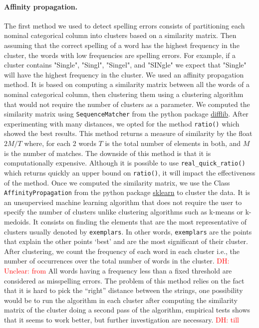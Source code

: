 \documentclass{article}
\newcommand\dhawat[1]{\textcolor{red}{DH: #1}}
\begin{document}
\paragraph{ Affinity propagation.}
\label{sub:Affinity propagation algorithm}
The first method we used to detect spelling errors consists of partitioning each nominal categorical column into clusters based on a similarity matrix.
Then assuming that the correct spelling of a word has the highest frequency in the cluster, the words with low frequencies are spelling errors.
For example, if a cluster contains "Single", "Singl", "Singel", and "SINgle" we expect that "Single" will have the highest frequency in the cluster.
We used an affinity propagation method.
It is based on computing a similarity matrix between all the words of a nominal categorical column, then clustering them using a clustering algorithm that would not require the number of clusters as a parameter.
We computed the similarity matrix using \texttt{SequenceMatcher} from the python package \href{https://docs.python.org/3/library/difflib.html}{difflib}.
After experimenting with many distances, we opted for the method \texttt{ratio()} which showed the best results.
This method returns a measure of similarity by the float $2M /T$ where, for each 2 words $T$ is the total number of elements in both, and $M$ is the number of matches.
The downside of this method is that it is computationally expensive.
Although it is possible to use \texttt{real\_quick\_ratio()} which returns quickly an upper bound on \texttt{ratio()}, it will impact the effectiveness of the method. Once we computed the similarity matrix, we use the Class \texttt{AffinityPropagation} from the python package \href{https://scikit-learn.org/stable/modules/generated/sklearn.cluster.AffinityPropagation.html#sklearn-cluster-affinitypropagation}{sklearn} to cluster the data.
It is an unsupervised machine learning algorithm that does not require the user to specify the number of clusters unlike clustering algorithms such as k-means or k-medoids.
It consists on finding the elements that are the most representative of clusters usually denoted by \texttt{exemplars}.
In other words, \texttt{exemplars} are the points that explain the other points ‘best’ and are the most significant of their cluster.
After clustering, we count the frequency of each word in each cluster i.e., the number of occurrences over the total number of words in the cluster.
\dhawat{Unclear: from} All words having a frequency less than a fixed threshold are considered as misspelling errors.
The problem of this method relies on the fact that it is hard to pick the ``right'' distance between the strings, one possibility would be to run the algorithm in each cluster after computing the similarity matrix of the cluster doing a second pass of the algorithm, empirical tests shows that it seems to work better, but further investigation are necessary. \dhawat{till}
\end{document}
